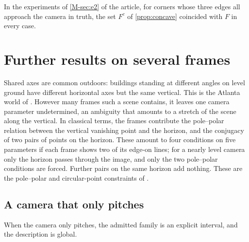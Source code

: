 In the experiments of \cref{M-sec:e2} of the article, for corners whose three edges all approach the camera in truth, the set $F^c$ of \cref{prop:concave} coincided with $F$ in every case.

\section{Further results on several frames}\label{sec:Sframes}

Shared axes are common outdoors: buildings standing at different angles on level ground have different horizontal axes but the same vertical. This is the Atlanta world of \citet{schindler2004}. However many frames such a scene contains, it leaves one camera parameter undetermined, an ambiguity that amounts to a stretch of the scene along the vertical. In classical terms, the frames contribute the pole--polar relation between the vertical vanishing point and the horizon, and the conjugacy of two pairs of points on the horizon. These amount to four conditions on five parameters if each frame shows two of its edge-on lines; for a nearly level camera only the horizon passes through the image, and only the two pole--polar conditions are forced. Further pairs on the same horizon add nothing. These are the pole--polar and circular-point constraints of \citet{liebowitz1999}.

\subsection{A camera that only pitches}

When the camera only pitches, the admitted family is an explicit interval, and the description is global.

